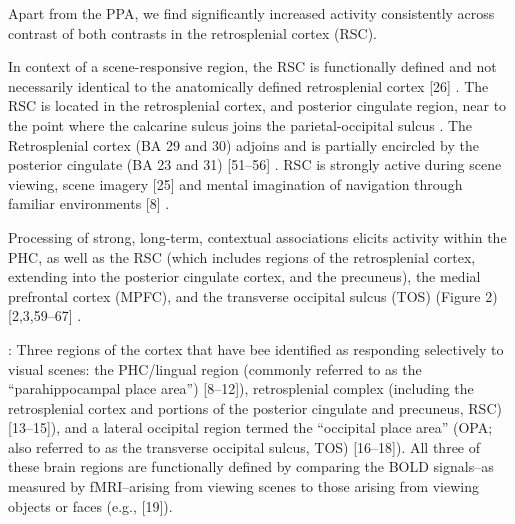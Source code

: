 \documentclass[english]{article}
\begin{document}


Apart from the PPA, we find significantly increased activity consistently across
contrast of both contrasts in the retrosplenial cortex (RSC).

In context of a scene-responsive region, the RSC is functionally defined and not
necessarily identical to the anatomically defined retrosplenial cortex [26]
\citep{epstein2008parahippocampal}.
The RSC is located in the retrosplenial cortex, and posterior cingulate region,
near to the point where the calcarine sulcus joins the parietal-occipital sulcus
\citep{epstein2008parahippocampal}.
The Retrosplenial cortex (BA 29 and 30) adjoins and is partially encircled by
the posterior cingulate (BA 23 and 31) [51–56]
\citep{epstein2008parahippocampal}.
RSC is strongly active during scene viewing, scene imagery [25] and mental
imagination of navigation through familiar environments [8]
\citep{epstein2008parahippocampal}.

Processing of strong, long-term, contextual associations elicits activity within
the PHC, as well as the RSC (which includes regions of the retrosplenial cortex,
extending into the posterior cingulate cortex, and the precuneus), the medial
prefrontal cortex (MPFC), and the transverse occipital sulcus (TOS) (Figure 2)
[2,3,59–67] \citep{aminoff2013role}.



\citep{aminoff2015associative}: Three regions of the cortex that have bee
identified as responding selectively to visual scenes: the PHC/lingual region
(commonly referred to as the “parahippocampal place area”) [8–12]),
retrosplenial complex (including the retrosplenial cortex and portions of the
posterior cingulate and precuneus, RSC) [13–15]), and a lateral occipital region
termed the “occipital place area” (OPA; also referred to as the transverse
occipital sulcus, TOS) [16–18]).
%
All three of these brain regions are functionally defined by comparing the BOLD
signals–as measured by fMRI–arising from viewing scenes to those arising from
viewing objects or faces (e.g., [19])\citep{aminoff2015associative}.
\end{document}
